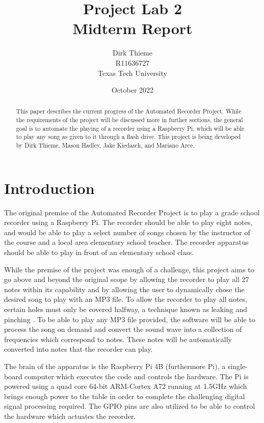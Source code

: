 \documentclass[UTF8, 12pt]{article}
\title{Project Lab 2\\\large Midterm Report}
\author{Dirk Thieme\\R11636727\\Texas Tech University}
\date{October 2022}
\begin{document}
\maketitle
{}
\newpage
{}

\begin{abstract}
    This paper describes the current progress of the Automated Recorder Project. While the requirements of the project will be discussed more in further sections, the general goal is to automate the playing of a recorder using a Raspberry Pi, which will be able to play any song as given to it through a flash drive. This project is being developed by Dirk Thieme, Mason Hadley, Jake Kiedasch, and Mariano Arce.
\end{abstract}

\newpage
\tableofcontents

\newpage
\listoffigures


\newpage
\section{Introduction}
    The original premise of the Automated Recorder Project is to play a grade school recorder using a Raspberry Pi. The recorder should be able to play eight notes, and would be able to play a select number of songs chosen by the instructor of the course and a local area elementary school teacher. The recorder apparatus should be able to play in front of an elementary school class.

    While the premise of the project was enough of a challenge, this project aims to go above and beyond the original scope by allowing the recorder to play all 27 notes within its capability and by allowing the user to dynamically chose the desired song to play with an MP3 file. To allow the recorder to play all notes, certain holes must only be covered halfway, a technique known as leaking and pinching \cite{rec_wiki}. To be able to play any MP3 file provided, the software will be able to process the song on demand and convert the sound wave into a collection of frequencies which correspond to notes. These notes will be automatically converted into notes that the recorder can play.

    The brain of the apparatus is the Raspberry Pi 4B (furthermore Pi), a single-board computer which executes the code and controls the hardware. The Pi is powered using a quad core 64-bit ARM-Cortex A72 running at 1.5GHz \cite{ras_pi} which brings enough power to the table in order to complete the challenging digital signal processing required. The GPIO pins are also utilized to be able to control the hardware which actuates the recorder.
\end{document}
